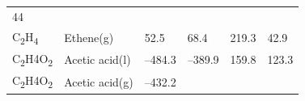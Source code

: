 \documentclass[
  9pt,
]{extbook}
\theoremstyle{definition}
\theoremstyle{definition}
\theoremstyle{definition}
\theoremstyle{remark}
\begin{document}
\begin{longtable}[]{@{}llllll@{}}
\begin{minipage}[t]{0.14\columnwidth}
44\strut
\end{minipage}\tabularnewline
\begin{minipage}[t]{0.07\columnwidth}\raggedright
C\textsubscript{2}H\textsubscript{4}\strut
\end{minipage} & \begin{minipage}[t]{0.17\columnwidth}\raggedright
Ethene(g)\strut
\end{minipage} & \begin{minipage}[t]{0.15\columnwidth}\raggedright
52.5\strut
\end{minipage} & \begin{minipage}[t]{0.15\columnwidth}\raggedright
68.4\strut
\end{minipage} & \begin{minipage}[t]{0.14\columnwidth}\raggedright
219.3\strut
\end{minipage} & \begin{minipage}[t]{0.14\columnwidth}\raggedright
42.9\strut
\end{minipage}\tabularnewline
\begin{minipage}[t]{0.07\columnwidth}\raggedright
C\textsubscript{2}H4O\textsubscript{2}\strut
\end{minipage} & \begin{minipage}[t]{0.17\columnwidth}\raggedright
Acetic acid(l)\strut
\end{minipage} & \begin{minipage}[t]{0.15\columnwidth}\raggedright
--484.3\strut
\end{minipage} & \begin{minipage}[t]{0.15\columnwidth}\raggedright
--389.9\strut
\end{minipage} & \begin{minipage}[t]{0.14\columnwidth}\raggedright
159.8\strut
\end{minipage} & \begin{minipage}[t]{0.14\columnwidth}\raggedright
123.3\strut
\end{minipage}\tabularnewline
\begin{minipage}[t]{0.07\columnwidth}\raggedright
C\textsubscript{2}H4O\textsubscript{2}\strut
\end{minipage} & \begin{minipage}[t]{0.17\columnwidth}\raggedright
Acetic acid(g)\strut
\end{minipage} & \begin{minipage}[t]{0.15\columnwidth}\raggedright
--432.2\strut
\end{minipage} & \begin{minipage}[t]{0.15\columnwidth}\raggedright

\end{minipage}
\end{longtable}
\end{document}
